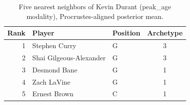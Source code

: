 \begin{table}[htbp]
  \centering\small
  \begin{tabular}{rllc}
    \toprule
    Rank & Player & Position & Archetype \\
    \midrule
    1 & Stephen Curry & G & 3 \\
    2 & Shai Gilgeous-Alexander & G & 3 \\
    3 & Desmond Bane & G & 1 \\
    4 & Zach LaVine & G & 1 \\
    5 & Ernest Brown & C & 1 \\
    \bottomrule
  \end{tabular}
  \caption{Five nearest neighbors of Kevin Durant (peak_age modality), Procrustes-aligned posterior mean.}
  \label{tab:Kevin_Durant_neighbors_peak_age}
\end{table}

